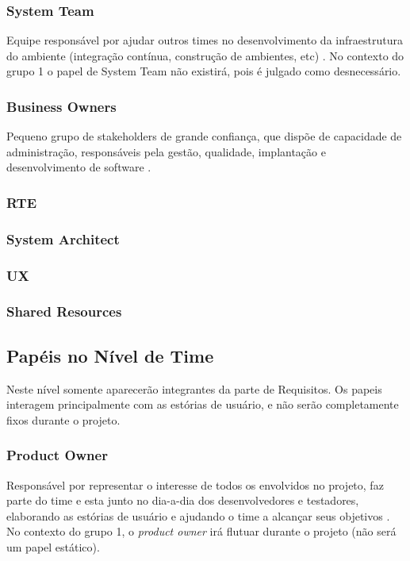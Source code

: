 \subsubsection{System Team}
Equipe responsável por ajudar outros times no desenvolvimento da infraestrutura do ambiente (integração contínua, construção de ambientes, etc) \cite{safesite003}. No contexto do grupo 1 o papel de System Team não existirá, pois é julgado como desnecessário.

\subsubsection{Business Owners}
Pequeno grupo de stakeholders de grande confiança, que dispõe de capacidade de administração, responsáveis pela gestão, qualidade, implantação e desenvolvimento de software \cite{safesite004}.

\subsubsection{RTE}
\subsubsection{System Architect}
\subsubsection{UX}
\subsubsection{Shared Resources}

\subsection{Papéis no Nível de Time}
Neste nível somente aparecerão integrantes da parte de Requisitos. Os papeis interagem principalmente com as estórias de usuário, e não serão completamente fixos durante o projeto.

\subsubsection{Product Owner}
Responsável por representar o interesse de todos os envolvidos no projeto, faz parte do time e esta junto no dia-a-dia dos desenvolvedores e testadores, elaborando as estórias de usuário e ajudando o time a alcançar seus objetivos \cite{safe008}. No contexto do grupo 1, o \emph{product owner} irá flutuar durante o projeto (não será um papel estático).

